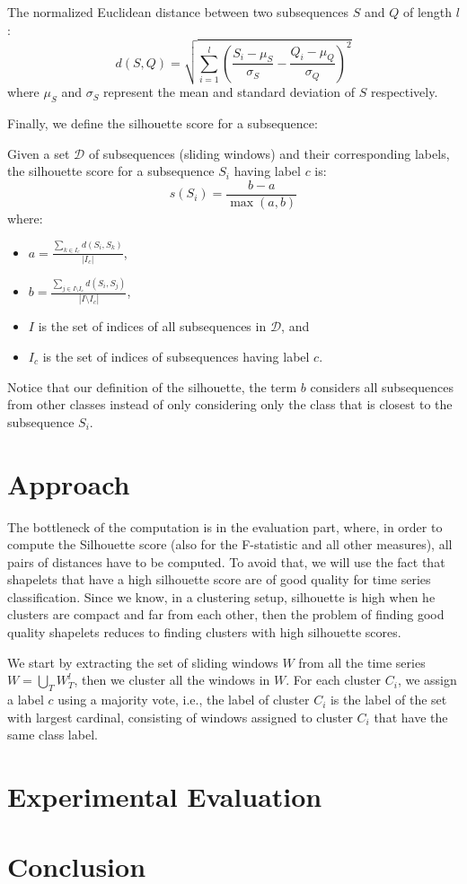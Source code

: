 \documentclass[sigconf, nonacm]{acmart}
\begin{document}
\begin{definition}
	The normalized Euclidean distance between two subsequences $S$ and $Q$ of
	length $l$:
	$$d(S, Q) = \sqrt{\sum_{i=1}^l (\frac{S_i - \mu_S}{\sigma_S} - \frac{Q_i -
				\mu_Q}{\sigma_Q})^2}$$
	where $\mu_S$ and $\sigma_S$ represent the mean and standard deviation of
	$S$ respectively.
\end{definition}

Finally, we define the silhouette score for a subsequence:

\begin{definition}
	Given a set $\mathcal{D}$ of subsequences (sliding windows) and their
	corresponding labels, the silhouette score for a subsequence $S_i$ having label
	$c$ is:
	$$
		s(S_i) = \frac{b - a}{\max{(a, b)}}
	$$
	where:
	\begin{itemize}
		\item $a = \frac{\sum_{k \in I_c}d(S_i, S_k)}{|I_c|}$,
		\item $b = \frac{\sum_{j \in I \setminus I_c}d(S_i, S_j)}{|I \setminus I_c|}$,
		\item $I$ is the set of indices of all subsequences in $\mathcal{D}$, and
		\item $I_c$ is the set of indices of subsequences having label $c$.
	\end{itemize}
\end{definition}

Notice that our definition of the silhouette, the term $b$ considers all
subsequences from other classes instead of only considering only the class that
is closest to the subsequence $S_i$.


\section{Approach}
The bottleneck of the computation is in the evaluation part, where, in order to
compute the Silhouette score (also for the F-statistic and all other measures),
all pairs of distances have to be computed. To avoid that, we will use the fact
that shapelets that have a high silhouette score are of good quality for time
series classification. Since we know, in a clustering setup, silhouette is high
when he clusters are compact and far from each other, then the problem of
finding good quality shapelets reduces to finding clusters with high silhouette
scores.

We start by extracting the set of sliding windows $W$ from all the time series
$W = \bigcup_T W_T^l$, then we cluster all the windows in $W$.
For each cluster $C_i$, we assign a label $c$ using a majority vote, i.e., the
label of cluster $C_i$ is the label of the set with largest cardinal, consisting
of windows assigned to cluster $C_i$ that have the same class label.

\section{Experimental Evaluation}

\section{Conclusion}




\end{document}
